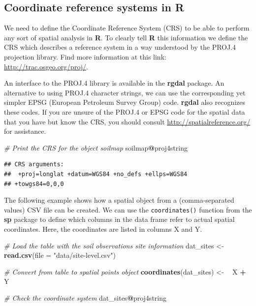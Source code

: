 \documentclass[10pt,b5paper,]{book}
\newenvironment{Shaded}{\begin{snugshade}}{\end{snugshade}}
\newcommand{\CommentTok}[1]{\textcolor[rgb]{0.56,0.35,0.01}{\textit{#1}}}
\newcommand{\DataTypeTok}[1]{\textcolor[rgb]{0.13,0.29,0.53}{#1}}
\newcommand{\ErrorTok}[1]{\textcolor[rgb]{0.64,0.00,0.00}{\textbf{#1}}}
\newcommand{\KeywordTok}[1]{\textcolor[rgb]{0.13,0.29,0.53}{\textbf{#1}}}
\newcommand{\NormalTok}[1]{#1}
\newcommand{\OperatorTok}[1]{\textcolor[rgb]{0.81,0.36,0.00}{\textbf{#1}}}
\newcommand{\StringTok}[1]{\textcolor[rgb]{0.31,0.60,0.02}{#1}}
\theoremstyle{definition}
\theoremstyle{definition}
\theoremstyle{definition}
\theoremstyle{remark}
\begin{document}
\hypertarget{coordinate-reference-systems-in-r}{%
\subsection{Coordinate reference systems in
R}\label{coordinate-reference-systems-in-r}}

We need to define the Coordinate Reference System (CRS) to be able to
perform any sort of spatial analysis in \textbf{R}. To clearly tell
\textbf{R} this information we define the CRS which describes a
reference system in a way understood by the PROJ.4 projection library.
Find more information at this link: \url{http://trac.osgeo.org/proj/}.

An interface to the PROJ.4 library is available in the \textbf{rgdal}
package. An alternative to using PROJ.4 character strings, we can use
the corresponding yet simpler EPSG (European Petroleum Survey Group)
code. \textbf{rgdal} also recognizes these codes. If you are unsure of
the PROJ.4 or EPSG code for the spatial data that you have but know the
CRS, you should consult \url{http://spatialreference.org/} for
assistance.

\begin{Shaded}
\begin{Highlighting}[]
\CommentTok{# Print the CRS for the object soilmap}
\NormalTok{soilmap}\OperatorTok{@}\NormalTok{proj4string}
\end{Highlighting}
\end{Shaded}

\begin{verbatim}
## CRS arguments:
##  +proj=longlat +datum=WGS84 +no_defs +ellps=WGS84
## +towgs84=0,0,0
\end{verbatim}

The following example shows how a spatial object from a (comma-separated
values) CSV file can be created. We can use the \texttt{coordinates()}
function from the \textbf{sp} package to define which columns in the
data frame refer to actual spatial coordinates. Here, the coordinates
are listed in columns X and Y.

\begin{Shaded}
\begin{Highlighting}[]
\CommentTok{# Load the table with the soil observations site information}
\NormalTok{dat_sites <-}\StringTok{ }\KeywordTok{read.csv}\NormalTok{(}\DataTypeTok{file =} \StringTok{"data/site-level.csv"}\NormalTok{)}

\CommentTok{# Convert from table to spatial points object}
\KeywordTok{coordinates}\NormalTok{(dat_sites) <-}\StringTok{ }\ErrorTok{~}\StringTok{ }\NormalTok{X }\OperatorTok{+}\StringTok{ }\NormalTok{Y}

\CommentTok{# Check the coordinate system}
\NormalTok{dat_sites}\OperatorTok{@}\NormalTok{proj4string}
\end{Highlighting}
\end{Shaded}
\end{document}
